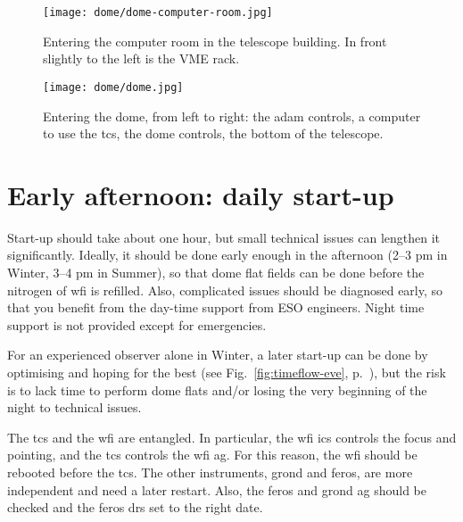\documentclass[11pt,fleqn]{book}
\def\figref#1{Fig.~\ref{fig:#1}, p.~\pageref{fig:#1}}
\begin{document}
\begin{figure}[!ht]
\centering
\texttt{[image: dome/dome-computer-room.jpg]}
\caption[Entering the computer room in the telescope building]{Entering the computer room in the telescope building. In front slightly to the left is the VME rack.} 
\label{fig:computer-room}
\end{figure}

\begin{figure}[!ht]
\centering
\texttt{[image: dome/dome.jpg]}
\caption[Entering the dome]{Entering the dome, from left to right: the \gls{adam} controls,
a computer to use the \gls{tcs}, the dome controls, the bottom of the telescope.}
\label{fig:dome}
\end{figure}

\cleardoublepage



%                                       
%                                  
%
%


\chapter{Early afternoon: daily start-up}
\label{chap:startup}

Start-up should take about one hour, but small technical issues can lengthen it significantly.  Ideally, it should be done early enough in the afternoon (2--3 pm in Winter, 3--4 pm in Summer), so that dome flat fields can be done before the nitrogen of \gls{wfi} is refilled.  Also, complicated issues should be diagnosed early, so that you benefit from the day-time support from ESO engineers.  Night time support is not provided except for emergencies.

For an experienced observer alone in Winter, a later start-up can be done by optimising and hoping for the best (see \figref{timeflow-eve}), but the risk is to lack time to perform dome flats and/or losing the very beginning of the night to technical issues.

The \gls{tcs} and the \gls{wfi} are entangled.  In particular, the \gls{wfi} \gls{ics} controls the focus and pointing, and the \gls{tcs} controls the \gls{wfi} \gls{ag}.  For this reason, the \gls{wfi} should be rebooted before the \gls{tcs}.  The other instruments, \gls{grond} and \gls{feros}, are more independent and need a later restart. Also, the \gls{feros} and \gls{grond} \gls{ag} should be checked and the \gls{feros} \gls{drs} set to the right date.
\end{document}
